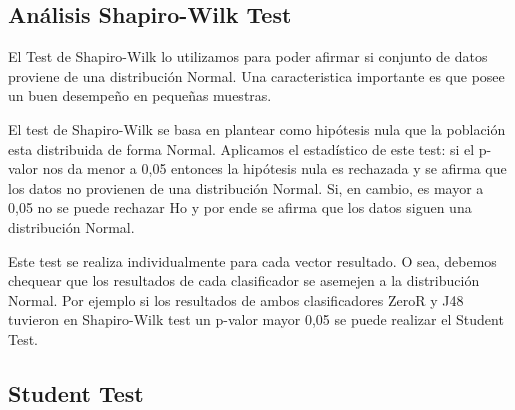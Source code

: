\subsection{Análisis Shapiro-Wilk Test}



El Test de Shapiro-Wilk lo utilizamos para poder afirmar si conjunto de datos proviene de una distribución Normal. Una caracteristica importante es que posee un buen desempeño en pequeñas muestras.


El test de Shapiro-Wilk se basa en plantear como hipótesis nula que la población esta distribuida de forma Normal. Aplicamos el estadístico de este test: si el p-valor nos da menor a 0,05 entonces la hipótesis nula es rechazada y se afirma que los datos no provienen de una distribución Normal. Si, en cambio, es mayor a 0,05 no se puede rechazar Ho y por ende se afirma que los datos siguen una distribución Normal.

Este test se realiza individualmente para cada vector resultado. O sea, debemos chequear que los resultados de cada clasificador se asemejen a la distribución Normal. Por ejemplo si los resultados de ambos clasificadores ZeroR y J48 tuvieron en Shapiro-Wilk test un p-valor mayor 0,05  se puede realizar el Student Test. 

\subsection{Student Test}



